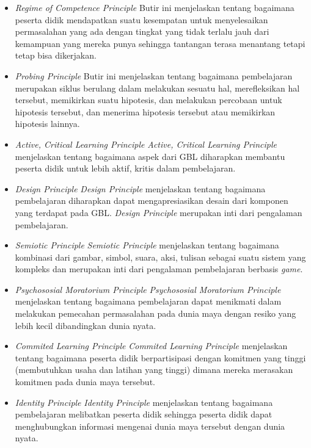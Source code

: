 	\begin{itemize}
		\item \textit{Regime of Competence Principle}
			\subitem Butir ini menjelaskan tentang bagaimana peserta didik mendapatkan suatu kesempatan untuk menyelesaikan permasalahan yang ada dengan tingkat yang tidak terlalu jauh dari kemampuan yang mereka punya sehingga tantangan terasa menantang tetapi tetap bisa dikerjakan.
		\item \textit{Probing Principle}
			\subitem Butir ini menjelaskan tentang bagaimana pembelajaran merupakan siklus berulang dalam melakukan sesuatu hal, merefleksikan hal tersebut, memikirkan suatu hipotesis, dan melakukan percobaan untuk hipotesis tersebut, dan menerima hipotesis tersebut atau memikirkan hipotesis lainnya.
		\item \textit{Active, Critical Learning Principle}
			\subitem \textit{Active, Critical Learning Principle} menjelaskan tentang bagaimana aspek dari GBL diharapkan membantu peserta didik untuk lebih aktif, kritis dalam pembelajaran.
		\item \textit{Design Principle}
			\subitem \textit{Design Principle} menjelaskan tentang bagaimana pembelajaran diharapkan dapat mengapresiasikan desain dari komponen yang terdapat pada GBL. \textit{Design Principle} merupakan inti dari pengalaman pembelajaran.
		\item \textit{Semiotic Principle}
			\subitem \textit{Semiotic Principle} menjelaskan tentang bagaimana kombinasi dari gambar, simbol, suara, aksi, tulisan sebagai suatu sistem yang kompleks dan merupakan inti dari pengalaman pembelajaran berbasis \textit{game}.
		\item \textit{Psychososial Moratorium Principle}
			\subitem \textit{Psychososial Moratorium Principle} menjelaskan tentang bagaimana pembelajaran dapat menikmati dalam melakukan pemecahan permasalahan pada dunia maya dengan resiko yang lebih kecil dibandingkan dunia nyata.
		\item \textit{Commited Learning Principle}
			\subitem \textit{Commited Learning Principle} menjelaskan tentang bagaimana peserta didik berpartisipasi dengan komitmen yang tinggi (membutuhkan usaha dan latihan yang tinggi) dimana mereka merasakan komitmen pada dunia maya tersebut.
		\item \textit{Identity Principle}
			\subitem \textit{Identity Principle} menjelaskan tentang bagaimana pembelajaran melibatkan peserta didik sehingga peserta didik dapat menghubungkan informasi mengenai dunia maya tersebut dengan dunia nyata.

\end{itemize}
